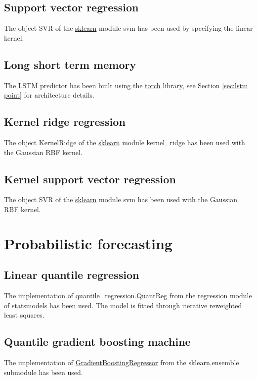\subsection{Support vector regression}
The object SVR of the \href{https://scikit-learn.org/stable/}{sklearn} module svm has been used by specifying the linear kernel.

\subsection{Long short term memory}
The LSTM predictor has been built using the \href{https://pytorch.org}{torch} library, see Section \ref{sec:lstm point} for architecture details.

\subsection{Kernel ridge regression}
The object KernelRidge of the \href{https://scikit-learn.org/stable/}{sklearn} module kernel\_ridge has been used with the Gaussian RBF kernel.

\subsection{Kernel support vector regression}
The object SVR of the \href{https://scikit-learn.org/stable/}{sklearn} module svm has been used with the Gaussian RBF kernel.

\section{Probabilistic forecasting}
\subsection{Linear quantile regression}
The implementation of \href{https://www.statsmodels.org/dev/generated/statsmodels.regression.quantile_regression.QuantReg.html}{quantile\_regression.QuantReg} from the regression module of statsmodels has been used.
The model is fitted through iterative reweighted least squares.
\subsection{Quantile gradient boosting machine}
The implementation of \href{https://scikit-learn.org/stable/modules/generated/sklearn.ensemble.GradientBoostingRegressor.html}{GradientBoostingRegressor} from the sklearn.ensemble submodule has been used.
